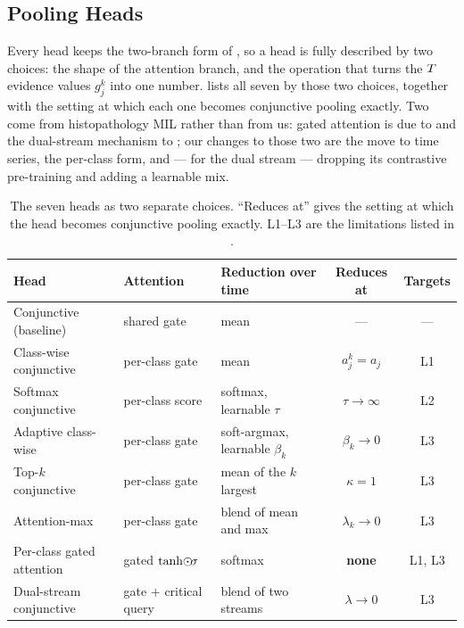 \subsection{Pooling Heads}
\label{app:heads}

Every head keeps the two-branch form of , so a head is fully described by two
choices: the shape of the attention branch, and the operation that turns the $T$ evidence
values $g_j^k$ into one number.  lists all seven by those two choices, together
with the setting at which each one becomes conjunctive pooling exactly. Two come from histopathology
MIL rather than from us: gated attention is due to \citet{ilse2018attention} and the dual-stream
mechanism to \citet{li2021dsmil}; our changes to those two are the move to time series, the per-class
form, and --- for the dual stream --- dropping its contrastive pre-training and adding a learnable
mix.

\begin{table}[h]
\caption{The seven heads as two separate choices. ``Reduces at'' gives the setting at which the head
becomes conjunctive pooling exactly. L1--L3 are the limitations listed in .}
\label{tab:app_heads}
\begin{center}
\scriptsize
\setlength{\tabcolsep}{3.5pt}
\begin{tabular}{lllcc}
\toprule
\textbf{Head} & \textbf{Attention} & \textbf{Reduction over time} & \textbf{Reduces at} & \textbf{Targets} \\
\midrule
Conjunctive (baseline)    & shared gate    & mean                            & --- & --- \\
Class-wise conjunctive    & per-class gate & mean                            & $a_j^k = a_j$ & L1 \\
Softmax conjunctive       & per-class score& softmax, learnable $\tau$       & $\tau \to \infty$ & L2 \\
Adaptive class-wise       & per-class gate & soft-argmax, learnable $\beta_k$& $\beta_k \to 0$ & L3 \\
Top-$k$ conjunctive       & per-class gate & mean of the $k$ largest         & $\kappa = 1$ & L3 \\
Attention-max             & per-class gate & blend of mean and max           & $\lambda_k \to 0$ & L3 \\
Per-class gated attention & gated $\tanh\!\odot\!\sigma$ & softmax             & \textbf{none} & L1, L3 \\
Dual-stream conjunctive   & gate $+$ critical query & blend of two streams   & $\lambda \to 0$ & L3 \\
\bottomrule
\end{tabular}
\end{center}
\end{table}

